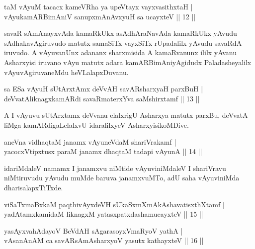 \begin{shl}
taM vAyuM tacacx kameVRha ya upeVtayx vayxvasithxtaH |\\
vAyukamARBimAniV sanupxmAnAvxyuH sa ucayxteV \hfill || 12 ||
\end{shl}

\begin{artha}
savaR sAmAnayxvAda kamaRkUkx asAdhAraNavAda kamaRkUkx yAvudu sAdhakavAgiruvudo matutx samaSiTx vayxSiTx rUpadalilx yAvudu savaRdA iruvudo. A vAyuvanUnx adananx sharxmisida A kamaRvanunx ililx yAvanu Asharxyisi iruvano vAyu matutx adara kamARBimAniyAgidudx Paladasheyalilx vAyuvAgiruvaneMdu heVLalapxDuvanu.
\end{artha}


\begin{shl}
sa ESa vAyuH sUtArxtAmx deVvAH savARsharxyaH parxBuH |\\
deVvatAliknagxkamARdi savaRmaterxYva saMshirxtamf \hfill || 13 ||
\end{shl}

\begin{artha}
A I vAyuvu sUtArxtamx deVvanu elalxrigU Asharxya matutx parxBu, deVvatA liMga kamARdigaLelalxvU idaralilxyeV AsharxyisikoMDive.
\end{artha}


\begin{shl}
aneVna vidhaqtaM janamx vAyuneVdaM shariVrakamf |\\
yacocxVtipxtusx paraM janamx dhaqtaM tadapi vAyunA \hfill || 14 ||
\end{shl}

\begin{artha}
idariMdaleV namamx I janamxvu niMtide vAyuviniMdaleV I shariVravu niMtiruvudu yAvudu muMde baruva janamxvuMTo, adU saha vAyuviniMda dharisalapxTiTxde.
\end{artha}

\begin{shl}
viSaTxmaBxkaM paqthivAyxdeVH sUkaSxmXmAkAshavatisxthXtamf |\\
yadAtamxkamidaM liknagxM yatasxpatxdashamucayxteV \hfill || 15 ||
\end{shl}

\begin{shl}
yasAyx\s \s vahAdayoV BeVdAH sAgarasoyxVmaRyoV yathA |\\
vAsanAnAM ca savARsAmAsharxyoV yasutx kathayxteV \hfill || 16 ||
\end{shl}

